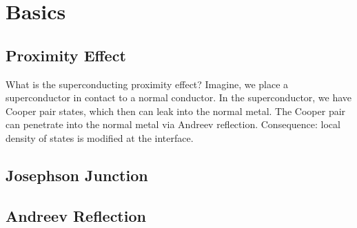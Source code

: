 \documentclass[a4paper]{article}
\begin{document}
	\section{Basics}
	\subsection{Proximity Effect}
	What is the superconducting proximity effect? Imagine, we place a superconductor in contact to a normal conductor. In the superconductor, we have Cooper pair states, which then can leak into the normal metal. The Cooper pair can penetrate into the normal metal via Andreev reflection.
	Consequence: local density of states is modified at the interface. 
	\subsection{Josephson Junction}
	\subsection{Andreev Reflection}
	
	
\end{document}
